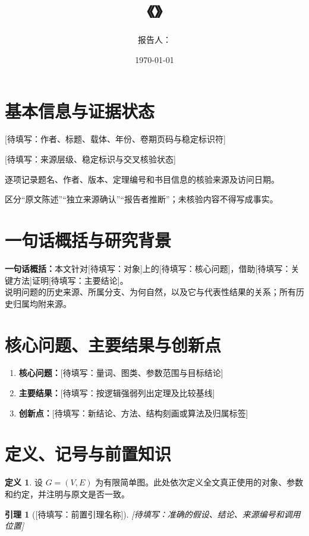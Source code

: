 \documentclass[UTF8,11pt,a4paper,fontset=fandol]{ctexart}
\title{\ReportTitle\\[0.4em]\large《\PaperTitle》}
\author{报告人：\Placeholder{姓名}}
\date{\today}
\newtheorem{lemma}[theorem]{引理}
\theoremstyle{definition}
\newtheorem{definition}[theorem]{定义}
\theoremstyle{remark}
\newcommand{\Placeholder}[1]{\textcolor{magenta!70!black}{[待填写：#1]}}
\providecommand{\SourceStatus}{\Placeholder{来源层级、稳定标识与交叉核验状态}}
\begin{document}
\maketitle
\tableofcontents

\section{基本信息与证据状态}
\begin{description}[style=nextline]
  \item[论文信息] \Placeholder{作者、标题、载体、年份、卷期页码与稳定标识符}
  \item[来源状态] \SourceStatus
  \item[核验记录] 逐项记录题名、作者、版本、定理编号和书目信息的核验来源及访问日期。
  \item[证据标签] 区分“原文陈述”“独立来源确认”“报告者推断”；未核验内容不得写成事实。
\end{description}

\section{一句话概括与研究背景}
\textbf{一句话概括：}本文针对\Placeholder{对象}上的\Placeholder{核心问题}，借助\Placeholder{关键方法}证明\Placeholder{主要结论}。\\
说明问题的历史来源、所属分支、为何自然，以及它与代表性结果的关系；所有历史归属均附来源。

\section{核心问题、主要结果与创新点}
\begin{enumerate}
  \item \textbf{核心问题：}\Placeholder{量词、图类、参数范围与目标结论}
  \item \textbf{主要结果：}\Placeholder{按逻辑强弱列出定理及比较基线}
  \item \textbf{创新点：}\Placeholder{新结论、方法、结构刻画或算法及归属标签}
\end{enumerate}

\section{定义、记号与前置知识}
\begin{definition}
设 $G=(V,E)$ 为有限简单图。此处依次定义全文真正使用的对象、参数和约定，并注明与原文是否一致。
\end{definition}
\begin{lemma}[\Placeholder{前置引理名称}]
\Placeholder{准确的假设、结论、来源编号和调用位置}
\end{lemma}
\end{document}

